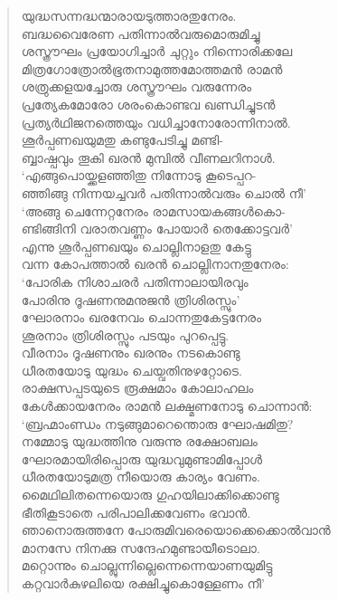 \begin{verse}
യുദ്ധസന്നദ്ധന്മാരായടുത്താരതുനേരം.\\
ബദ്ധവൈരേണ പതിന്നാല്‍വരുമൊരുമിച്ചു\\
ശസ്ത്രൗഘം പ്രയോഗിച്ചാര്‍ ചുറ്റും നിന്നൊരിക്കലേ\\
മിത്രഗോത്രോല്‍ഭൂതനാമുത്തമോത്തമന്‍ രാമന്‍\\
ശത്രുക്കളയച്ചോരു ശസ്ത്രൗഘം വരുന്നേരം\\
പ്രത്യേകമോരോ ശരംകൊണ്ടവ ഖണ്ഡിച്ചുടന്‍\\
പ്രത്യര്‍ഥിജനത്തെയും വധിച്ചാനോരോന്നിനാല്‍.\\
ശൂര്‍പ്പണഖയുമതു കണ്ടുപേടിച്ചു മണ്ടി-\\
ബ്ബാഷ്പവും തൂകി ഖരന്‍ മുമ്പില്‍ വീണലറിനാള്‍.\\
‘എങ്ങുപൊയ്ക്കളഞ്ഞിതു നിന്നോടു കൂടെപ്പറ-\\
ഞ്ഞിങ്ങു നിന്നയച്ചവര്‍ പതിന്നാല്‍വരും ചൊല്‍ നീ’\\
‘അങ്ങു ചെന്നേറ്റനേരം രാമസായകങ്ങള്‍കൊ-\\
ണ്ടിങ്ങിനി വരാതവണ്ണം പോയാര്‍ തെക്കോട്ടവര്‍’\\
എന്നു ശൂര്‍പ്പണഖയും ചൊല്ലിനാളതു കേട്ടു\\
വന്ന കോപത്താല്‍ ഖരന്‍ ചൊല്ലിനാനതുനേരം:\\
‘പോരിക നിശാചരര്‍ പതിന്നാലായിരവും\\
പോരിനു ദൂഷണനുമനുജന്‍ ത്രിശിരസ്സും’\\
ഘോരനാം ഖരനേവം ചൊന്നതുകേട്ടനേരം\\
ശൂരനാം ത്രിശിരസ്സും പടയും പുറപ്പെട്ടു.\\
വീരനാം ദൂഷണനും ഖരനും നടകൊണ്ടു\\
ധീരതയോടു യുദ്ധം ചെയ്വതിനുഴറ്റോടെ.\\
രാക്ഷസപ്പടയുടെ രൂക്ഷമാം കോലാഹലം\\
കേള്‍ക്കായനേരം രാമന്‍ ലക്ഷ്മണനോടു ചൊന്നാന്‍:\\
‘ബ്രഹ്മാംണ്ഡം നടുങ്ങുമാറെന്തൊരു ഘോഷമിതു?\\
നമ്മോടു യുദ്ധത്തിനു വരുന്നു രക്ഷോബലം\\
ഘോരമായിരിപ്പൊരു യുദ്ധവുമുണ്ടാമിപ്പോള്‍\\
ധീരതയോടുമത്ര നീയൊരു കാര്യം വേണം.\\
മൈഥിലിതന്നെയൊരു ഗുഹയിലാക്കിക്കൊണ്ടു\\
ഭീതികൂടാതെ പരിപാലിക്കവേണം ഭവാന്‍.\\
ഞാനൊരുത്തനേ പോരുമിവരെയൊക്കെക്കൊല്‍വാന്‍\\
മാനസേ നിനക്കു സന്ദേഹമുണ്ടായീടൊലാ.\\
മറ്റൊന്നും ചൊല്ലുന്നില്ലെന്നെന്നെയാണയുമിട്ടു\\
കറ്റവാര്‍കുഴലിയെ രക്ഷിച്ചുകൊള്ളേണം നീ’\\

\end{verse}
